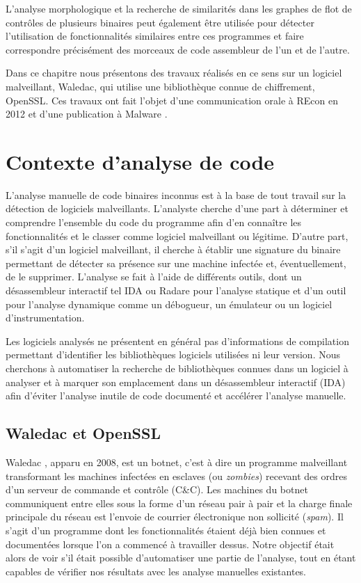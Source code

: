 L'analyse morphologique et la recherche de similarités dans les graphes de flot de contrôles de plusieurs binaires peut également être utilisée pour détecter l'utilisation de fonctionnalités similaires entre ces programmes et faire correspondre précisément des morceaux de code assembleur de l'un et de l'autre.

Dans ce chapitre nous présentons des travaux réalisés en ce sens sur un logiciel malveillant, Waledac, qui utilise une bibliothèque connue de chiffrement, OpenSSL.
Ces travaux ont fait l'objet d'une communication orale à REcon en 2012 \cite{REAT12} et d'une publication à Malware \cite{mal12}.

\section{Contexte d'analyse de code}
L'analyse manuelle de code binaires inconnus est à la base de tout travail sur la détection de logiciels malveillants.
L'analyste cherche d'une part à déterminer et comprendre l'ensemble du code du programme afin d'en connaître les fonctionnalités
et le classer comme logiciel malveillant ou légitime.
D'autre part, s'il s'agit d'un logiciel malveillant, il cherche à établir une signature du binaire permettant de détecter sa présence sur une machine infectée et, éventuellement, de le supprimer.
L'analyse se fait à l'aide de différents outils, dont un désassembleur interactif tel IDA \cite{IDA} ou Radare \cite{radare} pour l'analyse statique et d'un outil pour l'analyse dynamique comme un débogueur, un émulateur ou un logiciel d'instrumentation.

Les logiciels analysés ne présentent en général pas d'informations de compilation permettant d'identifier les bibliothèques logiciels utilisées ni leur version. Nous cherchons à automatiser la recherche de bibliothèques connues dans un logiciel à analyser et à marquer son emplacement dans un désassembleur interactif (IDA) afin d'éviter l'analyse inutile de code documenté et accélérer l'analyse manuelle.

\subsection{Waledac et OpenSSL}
Waledac \cite{CRFLSGBA10}, apparu en 2008, est un botnet, c'est à dire un programme malveillant transformant les machines infectées en esclaves (ou \emph{zombies}) recevant des ordres d'un serveur de commande et contrôle (C\&C).
Les machines du botnet communiquent entre elles sous la forme d'un réseau pair à pair et la charge finale principale du réseau est l'envoie de courrier électronique non sollicité (\emph{spam}).
Il s'agit d'un programme dont les fonctionnalités étaient déjà bien connues et documentées lorsque l'on a commencé à travailler dessus. Notre objectif était alors de voir s'il était possible d'automatiser une partie de l'analyse, tout en étant capables de vérifier nos résultats avec les analyse manuelles existantes.

